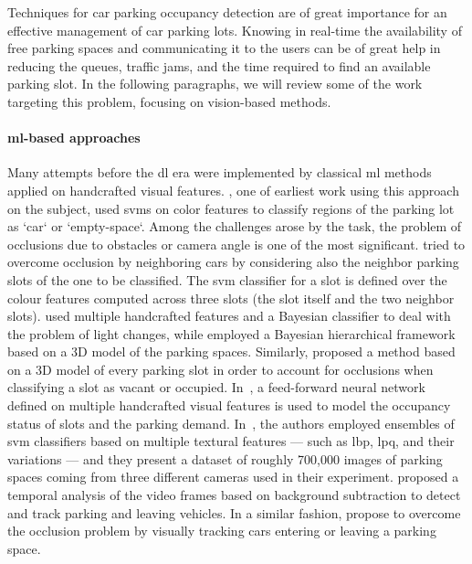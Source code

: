Techniques for car parking occupancy detection are of great importance for an effective management of car parking lots.
Knowing in real-time the availability of free parking spaces and communicating it to the users can be of great help in reducing the queues, traffic jams, and the time required to find an available parking slot.
In the following paragraphs, we will review some of the work targeting this problem, focusing on vision-based methods.

\paragraph{\gls{ml}-based approaches}
Many attempts before the \gls{dl} era were implemented by classical \gls{ml} methods applied on handcrafted visual features.
\citet{dan2002parking}, one of earliest work using this approach on the subject, used \glspl{svm} on color features to classify regions of the parking lot as `car` or `empty-space`.
Among the challenges arose by the task, the problem of occlusions due to obstacles or camera angle is one of the most significant.
\citet{wu2007robust} tried to overcome occlusion by neighboring cars by considering also the neighbor parking slots of the one to be classified.
The \gls{svm} classifier for a slot is defined over the colour features computed across three slots (the slot itself and the two neighbor slots).
\citet{tsai2007vehicle} used multiple handcrafted features and a Bayesian classifier to deal with the problem of light changes, while
\citet{huang2013vacant} employed a Bayesian hierarchical framework based on a 3D model of the parking spaces.
Similarly, \citet{delibaltov2013parking} proposed a method based on a 3D model of every parking slot in order to account for occlusions when classifying a slot as vacant or occupied.
In~\cite{jermsurawong2014one}, a feed-forward neural network defined on multiple handcrafted visual features is used to model the occupancy status of slots and the parking demand.
In~\cite{de2015pklot}, the authors employed ensembles of \gls{svm} classifiers based on multiple textural features --- such as \gls{lbp}, \gls{lpq}, and their variations --- and they present a dataset of roughly 700,000 images of parking spaces coming from three different cameras used in their experiment.
\citet{del2015vacant} proposed a temporal analysis of the video frames based on background subtraction to detect and track parking and leaving vehicles.
In a similar fashion, \citet{masmoudi2014} propose to overcome the occlusion problem by visually tracking cars entering or leaving a parking space.

